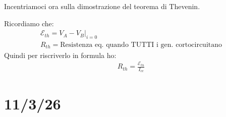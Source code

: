 \documentclass[a4paper, oneside]{article}
\begin{document}
Incentriamoci ora sulla dimostrazione del teorema di Thevenin.\\
    \begin{center}
    \end{center}
Ricordiamo che:
\begin{gather*}
    \mathcal{E}_{th} = V_A - V_B |_{i=0}\\
    R_{th} = \text{Resistenza eq. quando TUTTI i gen. cortocircuitano}
\end{gather*}
Quindi per riscriverlo in formula ho:
\begin{gather*}
    R_{th} = \frac{\mathcal{E}_{th}}{I_{cc}}
\end{gather*}

\section{11/3/26}
\end{document}
